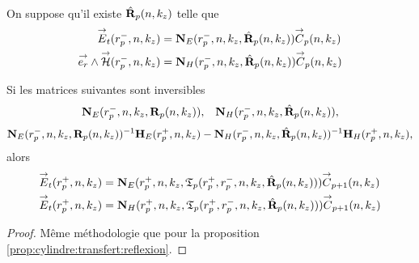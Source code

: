     \begin{prop}%
      \label{prop:cylindre:relevement:reflexion}{}~

      On suppose qu'il existe \(\hat{\mathbf{R}}_{p}(n,k_z)\) telle que 
      \begin{align*}
        {\overset{\rightarrow}{E}}_t(r_{p}^-,n,k_z) &= \mathbf{N}_{E}(r_p^-,n,k_z,\hat{\mathbf{R}}_{p}(n,k_z)){\overset{\rightarrow}{C}}_{p}(n,k_z)
        \\
        {\overset{\rightarrow}{e_r}}\wedge{\overset{\rightarrow}{\mathcal{H}}}(r_{p}^-,n,k_z) &= \mathbf{N}_{H}(r_p^-,n,k_z,\hat{\mathbf{R}}_{p}(n,k_z)){\overset{\rightarrow}{C}}_{p}(n,k_z)
      \end{align*}

      Si les matrices suivantes sont inversibles
      \begin{align*}
        \mathbf{N}_{E}(r_p^-,n,k_z,\mathbf{R}_{p}(n,k_z)), && \mathbf{N}_{H}(r_p^-,n,k_z,\hat{\mathbf{R}}_{p}(n,k_z)),
      \end{align*}
      \begin{align*}
        \mathbf{N}_{E}(r_p^-,n,k_z,\mathbf{R}_{p}(n,k_z))^{-1}\mathbf{H}_{E}(r_p^+,n,k_z) - \mathbf{N}_{H}(r_p^-,n,k_z,\hat{\mathbf{R}}_{p}(n,k_z))^{-1}\mathbf{H}_{H}(r_p^+,n,k_z),
      \end{align*}
      alors
      \begin{align*}
        {\overset{\rightarrow}{E}}_t(r_{p}^+,n,k_z) &= \mathbf{N}_{E}(r_p^+,n,k_z,\mathfrak{T}_p(r_p^+,r_p^-,n,k_z,\hat{\mathbf{R}}_{p}(n,k_z))){\overset{\rightarrow}{C}}_{p+1}(n,k_z)
        \\
        {\overset{\rightarrow}{E}}_t(r_{p}^+,n,k_z) &= \mathbf{N}_{H}(r_p^+,n,k_z,\mathfrak{T}_p(r_p^+,r_p^-,n,k_z,\hat{\mathbf{R}}_{p}(n,k_z))){\overset{\rightarrow}{C}}_{p+1}(n,k_z)
      \end{align*}
    \end{prop}

    \begin{proof}
      Même méthodologie que pour la proposition \ref{prop:cylindre:transfert:reflexion}.
    \end{proof}

